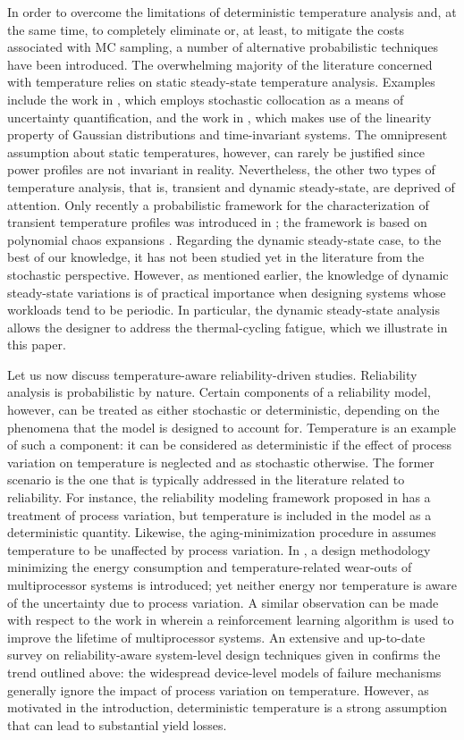 In order to overcome the limitations of deterministic temperature analysis and,
at the same time, to completely eliminate or, at least, to mitigate the costs
associated with \ac{MC} sampling, a number of alternative probabilistic
techniques have been introduced. The overwhelming majority of the literature
concerned with temperature relies on static steady-state temperature analysis.
Examples include the work in \cite{lee2013}, which employs stochastic
collocation \cite{maitre2010} as a means of uncertainty quantification, and the
work in \cite{juan2012}, which makes use of the linearity property of Gaussian
distributions and time-invariant systems. The omnipresent assumption about
static temperatures, however, can rarely be justified since power profiles are
not invariant in reality. Nevertheless, the other two types of temperature
analysis, that is, transient and dynamic steady-state, are deprived of
attention. Only recently a probabilistic framework for the characterization of
transient temperature profiles was introduced in \cite{ukhov2014b}; the
framework is based on polynomial chaos expansions \cite{maitre2010}. Regarding
the dynamic steady-state case, to the best of our knowledge, it has not been
studied yet in the literature from the stochastic perspective. However, as
mentioned earlier, the knowledge of dynamic steady-state variations is of
practical importance when designing systems whose workloads tend to be periodic.
In particular, the dynamic steady-state analysis allows the designer to address
the thermal-cycling fatigue, which we illustrate in this paper.

Let us now discuss temperature-aware reliability-driven studies. Reliability
analysis is probabilistic by nature. Certain components of a reliability model,
however, can be treated as either stochastic or deterministic, depending on the
phenomena that the model is designed to account for. Temperature is an example
of such a component: it can be considered as deterministic if the effect of
process variation on temperature is neglected and as stochastic otherwise. The
former scenario is the one that is typically addressed in the literature related
to reliability. For instance, the reliability modeling framework proposed in
\cite{xiang2010} has a treatment of process variation, but temperature is
included in the model as a deterministic quantity. Likewise, the
aging-minimization procedure in \cite{ukhov2012} assumes temperature to be
unaffected by process variation. In \cite{das2014a}, a design methodology
minimizing the energy consumption and temperature-related wear-outs of
multiprocessor systems is introduced; yet neither energy nor temperature is
aware of the uncertainty due to process variation. A similar observation can be
made with respect to the work in \cite{das2014c} wherein a reinforcement
learning algorithm is used to improve the lifetime of multiprocessor systems. An
extensive and up-to-date survey on reliability-aware system-level design
techniques given in \cite{das2014b} confirms the trend outlined above: the
widespread device-level models of failure mechanisms generally ignore the impact
of process variation on temperature. However, as motivated in the introduction,
deterministic temperature is a strong assumption that can lead to substantial
yield losses.

